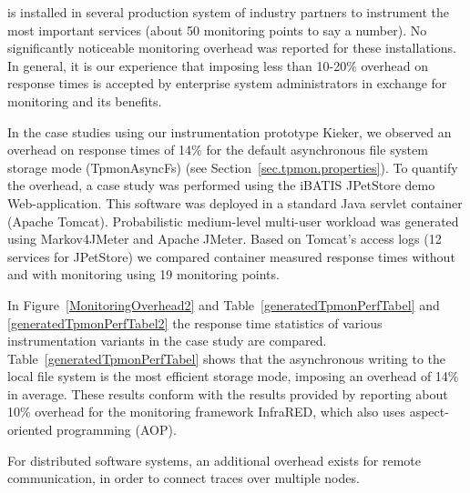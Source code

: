 \documentclass[a4paper,12pt]{scrartcl}
\begin{document}
\tpmon{} is installed in several production system of industry partners to instrument the most important services (about 50 monitoring points to say a number). No significantly noticeable monitoring overhead was reported for these installations. In general, it is our experience that imposing less than 10-20\% overhead on response times is accepted by enterprise system administrators in exchange for monitoring and its benefits.

In the case studies using our instrumentation prototype Kieker, we observed an overhead on response times of 14\% for the default asynchronous file system storage mode (TpmonAsyncFs) (see Section~\ref{sec.tpmon.properties}). To quantify the overhead, a case study was performed using the iBATIS JPetStore demo Web-application. This software was deployed in a standard Java servlet container (Apache Tomcat). Probabilistic medium-level multi-user workload was generated using Markov4JMeter and Apache JMeter. Based on Tomcat's access logs (12 services for JPetStore) we compared container measured response times without and with \tpmon{} monitoring using 19 monitoring points.

In Figure~\ref{MonitoringOverhead2} and Table~\ref{generatedTpmonPerfTabel} and  \ref{generatedTpmonPerfTabel2} the response time statistics of various instrumentation variants in the case study are compared. Table~\ref{generatedTpmonPerfTabel} shows that the asynchronous writing to the local file system is the most efficient storage mode, imposing an overhead of 14\% in average. These results conform with the results provided by \citet{GovindrajNarayananThomasNairP06OnUsingAOPforApplicationPerformanceManagement} reporting about 10\% overhead for the monitoring framework InfraRED, which also uses aspect-oriented programming (AOP).

For distributed software systems, an additional overhead exists for remote communication, in order to connect traces over multiple nodes.


\end{document}
